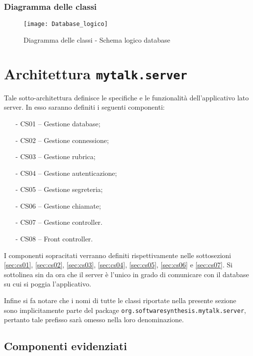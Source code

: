 \subsubsection{Diagramma delle classi}
\begin{figure}[H]
\begin{center}
\texttt{[image: Database\_logico]}
\caption{Diagramma delle classi - Schema logico database}\label{fig:database_logico}
\end{center}
\end{figure}
\clearpage


\section{Architettura \texttt{mytalk.server}}\label{sec:server}
Tale sotto-architettura definisce le specifiche e le funzionalità dell'applicativo lato server. In esso saranno definiti i seguenti componenti:
\begin{itemize}[noitemsep,nolistsep]
	\item[-] \textsf{CS01 -- Gestione database};
	\item[-] \textsf{CS02 -- Gestione connessione};
	\item[-] \textsf{CS03 -- Gestione rubrica};
	\item[-] \textsf{CS04 -- Gestione autenticazione};
	\item[-] \textsf{CS05 -- Gestione segreteria};
	\item[-] \textsf{CS06 -- Gestione chiamate};
	\item[-] \textsf{CS07 -- Gestione controller}.
	\item[-] \textsf{CS08 -- Front controller}.
\end{itemize}

I componenti sopracitati verranno definiti rispettivamente nelle sottosezioni \ref{sec:cs01}, \ref{sec:cs02}, \ref{sec:cs03}, \ref{sec:cs04}, \ref{sec:cs05}, \ref{sec:cs06} e \ref{sec:cs07}. Si sottolinea sin da ora che il server è l'unico in grado di comunicare con il database su cui si poggia l'applicativo.

Infine si fa notare che i nomi di tutte le classi riportate nella presente sezione sono implicitamente parte del package \texttt{org.softwaresynthesis.mytalk.server}, pertanto tale prefisso sarà omesso nella loro denominazione.


\subsection{Componenti evidenziati}

